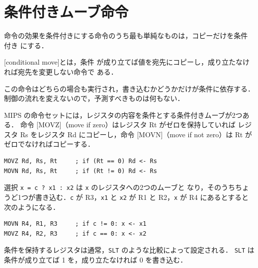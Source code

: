 \documentclass[../main.tex]{subfiles}
\begin{document}
\section{条件付きムーブ命令}
\label{sec:l05-cmov}

命令の効果を条件付きにする命令のうち最も単純なものは，コピーだけを条件付き
にする．

\begin{definition}[条件付きムーブ]
  \label{def:l05-cmov}
  [conditional move]とは，条件
  が成り立てば値を宛先にコピーし，成り立たなければ宛先を変更しない命令で
  ある．
\end{definition}

この命令はどちらの場合も実行され，書き込むかどうかだけが条件に依存する．
制御の流れを変えないので，予測すべきものは何もない．

MIPS の命令セットには，レジスタの内容を条件とする条件付きムーブが2つある．
命令 [MOVZ]（move if zero）はレジスタ Rt がゼロを保持していれば
レジスタ Rs をレジスタ Rd にコピーし，命令 [MOVN]（move if not
zero）は Rt がゼロでなければコピーする．
\begin{lstlisting}[language={[x86masm]Assembler}, numbers=none]
MOVZ Rd, Rs, Rt     ; if (Rt == 0) Rd <- Rs
MOVN Rd, Rs, Rt     ; if (Rt != 0) Rd <- Rs
\end{lstlisting}
選択 \texttt{x = c ? x1 : x2} は \texttt{x} のレジスタへの2つのムーブと
なり，そのうちちょうど1つが書き込む．\texttt{c} が R3，\texttt{x1} と
\texttt{x2} が R1 と R2，\texttt{x} が R4 にあるとすると次のようになる．
\begin{lstlisting}[language={[x86masm]Assembler}, numbers=none]
MOVN R4, R1, R3     ; if c != 0: x <- x1
MOVZ R4, R2, R3     ; if c == 0: x <- x2
\end{lstlisting}
条件を保持するレジスタは通常，\texttt{SLT} のような比較によって設定される．
\texttt{SLT} は条件が成り立てば 1 を，成り立たなければ 0 を書き込む．%
\end{document}
